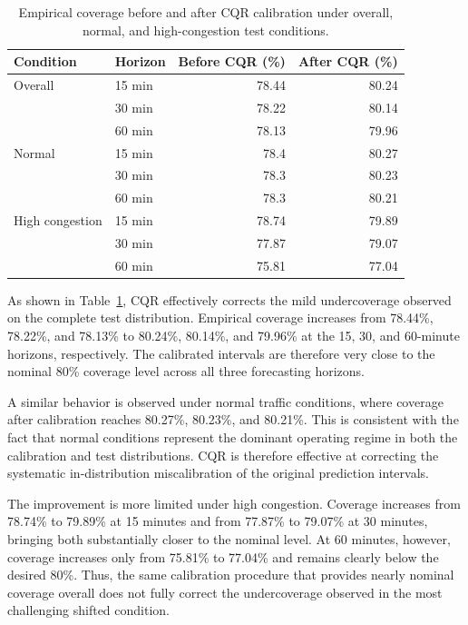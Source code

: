 \begin{table}[t]
    \centering
    \caption{Empirical coverage before and after CQR calibration under
    overall, normal, and high-congestion test conditions.}
    \label{tab:cqr_results}
    \begin{tabular}{llrr}
        \toprule
        Condition & Horizon & Before CQR (\%) & After CQR (\%) \\
        \midrule
        Overall
        & 15 min & 78.44 & 80.24 \\
        & 30 min & 78.22 & 80.14 \\
        & 60 min & 78.13 & 79.96 \\
        \midrule
        Normal
        & 15 min & 78.4 & 80.27 \\
        & 30 min & 78.3 & 80.23 \\
        & 60 min & 78.3 & 80.21 \\
        \midrule
        High congestion
        & 15 min & 78.74 & 79.89 \\
        & 30 min & 77.87 & 79.07 \\
        & 60 min & 75.81 & 77.04 \\
        \bottomrule
    \end{tabular}
\end{table}

As shown in Table~\ref{tab:cqr_results}, CQR effectively corrects the mild
undercoverage observed on the complete test distribution. Empirical coverage
increases from 78.44\%, 78.22\%, and 78.13\% to 80.24\%, 80.14\%, and
79.96\% at the 15, 30, and 60-minute horizons, respectively. The calibrated
intervals are therefore very close to the nominal 80\% coverage level across
all three forecasting horizons.

A similar behavior is observed under normal traffic conditions, where
coverage after calibration reaches 80.27\%, 80.23\%, and 80.21\%. This is
consistent with the fact that normal conditions represent the dominant
operating regime in both the calibration and test distributions. CQR is
therefore effective at correcting the systematic in-distribution
miscalibration of the original prediction intervals.

The improvement is more limited under high congestion. Coverage increases
from 78.74\% to 79.89\% at 15 minutes and from 77.87\% to 79.07\% at
30 minutes, bringing both substantially closer to the nominal level. At
60 minutes, however, coverage increases only from 75.81\% to 77.04\% and
remains clearly below the desired 80\%. Thus, the same calibration procedure
that provides nearly nominal coverage overall does not fully correct the
undercoverage observed in the most challenging shifted condition.



